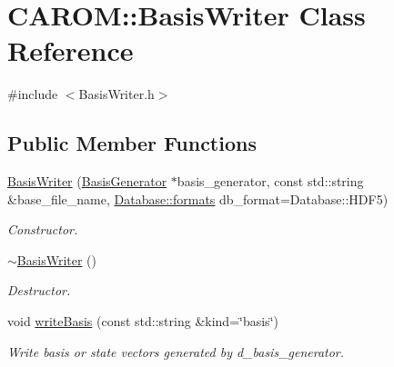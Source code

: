 \hypertarget{class_c_a_r_o_m_1_1_basis_writer}{\section{C\-A\-R\-O\-M\-:\-:Basis\-Writer Class Reference}
\label{class_c_a_r_o_m_1_1_basis_writer}
}


{\ttfamily \#include $<$Basis\-Writer.\-h$>$}

\subsection*{Public Member Functions}
\begin{DoxyCompactItemize}
\item 
\hyperlink{class_c_a_r_o_m_1_1_basis_writer_a759adfff8fb4c96fb7cd57a67d00efad}{Basis\-Writer} (\hyperlink{class_c_a_r_o_m_1_1_basis_generator}{Basis\-Generator} $\ast$basis\-\_\-generator, const std\-::string \&base\-\_\-file\-\_\-name, \hyperlink{class_c_a_r_o_m_1_1_database_a8ab29ee6466ef8415ee0ef93d94cc5f7}{Database\-::formats} db\-\_\-format=Database\-::\-H\-D\-F5)
\begin{DoxyCompactList}\small\item\em Constructor. \end{DoxyCompactList}\item 
\hypertarget{class_c_a_r_o_m_1_1_basis_writer_a2887f128097832d8bf59f03245e8ca6c}{\hyperlink{class_c_a_r_o_m_1_1_basis_writer_a2887f128097832d8bf59f03245e8ca6c}{$\sim$\-Basis\-Writer} ()}\label{class_c_a_r_o_m_1_1_basis_writer_a2887f128097832d8bf59f03245e8ca6c}

\begin{DoxyCompactList}\small\item\em Destructor. \end{DoxyCompactList}\item 
\hypertarget{class_c_a_r_o_m_1_1_basis_writer_a07ab687b1ef06432aacfaa651d7ee1af}{void \hyperlink{class_c_a_r_o_m_1_1_basis_writer_a07ab687b1ef06432aacfaa651d7ee1af}{write\-Basis} (const std\-::string \&kind=\char`\"{}basis\char`\"{})}\label{class_c_a_r_o_m_1_1_basis_writer_a07ab687b1ef06432aacfaa651d7ee1af}

\begin{DoxyCompactList}\small\item\em Write basis or state vectors generated by d\-\_\-basis\-\_\-generator. \end{DoxyCompactList}\end{DoxyCompactItemize}


